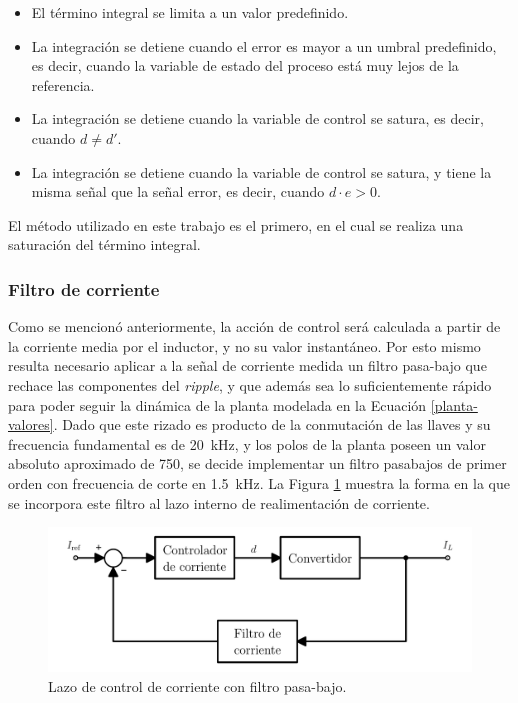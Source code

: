 \begin{itemize}
  \item El término integral se limita a un valor predefinido.
  \item La integración se detiene cuando el error es mayor a un umbral predefinido, es decir, cuando la variable de estado del proceso está muy lejos de la referencia.
  \item La integración se detiene cuando la variable de control se satura, es decir, cuando $d \neq d'$.
  \item La integración se detiene cuando la variable de control se satura, y tiene la misma señal que la señal error, es decir, cuando $d \cdot e > 0$.
\end{itemize}

El método utilizado en este trabajo es el primero, en el cual se realiza una saturación del término integral.

\subsubsection{Filtro de corriente}
\label{diseno-filtro-corriente}

Como se mencionó anteriormente, la acción de control será calculada a partir de la corriente media por el inductor, y no su valor instantáneo. Por esto mismo resulta necesario aplicar a la señal de corriente medida un filtro pasa-bajo que rechace las componentes del \emph{ripple}, y que además sea lo suficientemente rápido para poder seguir la dinámica de la planta modelada en la Ecuación \ref{planta-valores}. Dado que este rizado es producto de la conmutación de las llaves y su frecuencia fundamental es de \SI{20}{\kilo\hertz}, y los polos de la planta poseen un valor absoluto aproximado de 750, se decide implementar un filtro pasabajos de primer orden con frecuencia de corte en \SI{1.5}{\kilo\hertz}. La Figura \ref{filtro-corriente} muestra la forma en la que se incorpora este filtro al lazo interno de realimentación de corriente.

\begin{figure}[hbt!]
  \centering
  \includegraphics[width=0.65\columnwidth]{Imágenes/Diseño del control/Lazo de control de corriente con filtro.pdf}
  \caption{Lazo de control de corriente con filtro pasa-bajo.}
  \label{filtro-corriente}
\end{figure} 

